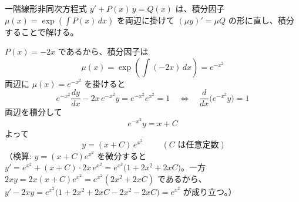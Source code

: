
一階線形非同次方程式 $y' + P(x)\,y = Q(x)$ は、積分因子 $\mu(x) = \exp\left(\int P(x)\,dx\right)$ を両辺に掛けて $(\mu y)' = \mu Q$ の形に直し、積分することで解ける。

$P(x) = -2x$ であるから、積分因子は
\[
\mu(x) = \exp\left(\int (-2x)\,dx\right) = e^{-x^{2}}
\]
両辺に $\mu(x) = e^{-x^{2}}$ を掛けると
\[
e^{-x^{2}}\frac{dy}{dx} - 2x\,e^{-x^{2}}y = e^{-x^{2}}e^{x^{2}} = 1
\quad\Longleftrightarrow\quad
\frac{d}{dx}\bigl(e^{-x^{2}}y\bigr) = 1
\]
両辺を積分して
\[
e^{-x^{2}}y = x + C
\]
よって
\[
\boxed{\; y = (x + C)\,e^{x^{2}} \;}
\qquad (C \text{ は任意定数})
\]
（検算: $y = (x+C)e^{x^{2}}$ を微分すると $y' = e^{x^{2}} + (x+C)\cdot 2x\,e^{x^{2}} = e^{x^{2}}\bigl(1 + 2x^{2} + 2xC\bigr)$。一方 $2xy = 2x(x+C)e^{x^{2}} = e^{x^{2}}(2x^{2}+2xC)$ であるから、$y' - 2xy = e^{x^{2}}\bigl(1+2x^{2}+2xC-2x^{2}-2xC\bigr) = e^{x^{2}}$ が成り立つ。）
